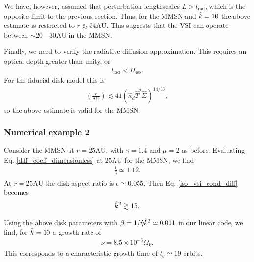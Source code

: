 We have, however, assumed that perturbation lengthscales
$L>l_\mathrm{rad}$, which is the opposite limit to the previous
section. Thus, for the MMSN and $\hat{k}=10$ the above estimate is
restricted to $r\lesssim 34\mathrm{AU}$. This suggests that the VSI
can operate between $\sim 20$---$30\mathrm{AU}$ in the MMSN. 

Finally, we need to verify the radiative diffusion approximation. This
requires an optical depth greater than unity, or
\begin{align}
  l_\mathrm{rad}< H_\mathrm{iso}. 
\end{align}
For the fiducial disk model this is
\begin{align}
  \left(\frac{r}{\mathrm{AU}}\right) \lesssim 41
  \left(\hat{\kappa}_d\hat{T}^2\hat{\Sigma}\right)^{14/33}, 
\end{align}
so the above estimate is valid for the MMSN. 

\subsubsection{Numerical example 2}
Consider the MMSN at $r=25\mathrm{AU}$, with $\gamma=1.4$ and $\mu=2$
as before. Evaluating Eq. \ref{diff_coeff_dimensionless} at
$25\mathrm{AU}$ for the MMSN, we find
\begin{align*}
  \frac{1}{\hat{\eta}} \simeq 1.12. 
\end{align*}
At $r=25\mathrm{AU}$ the disk aspect ratio is
$\epsilon\simeq0.055$. Then Eq. \ref{iso_vsi_cond_diff} becomes
\begin{align*}
  \hat{k}^2\gtrsim 15. 
\end{align*}

Using the above disk parameters with $\beta =
1/\hat{\eta}\hat{k}^2\simeq0.011$ in our linear code, we find, for
$\hat{k}=10$ a growth rate of 
\begin{align*}
\nu = 8.5\times10^{-3}\Omega_k. 
\end{align*} 
This corresponds to a characteristic growth time of $t_g\simeq19$
orbits. 
